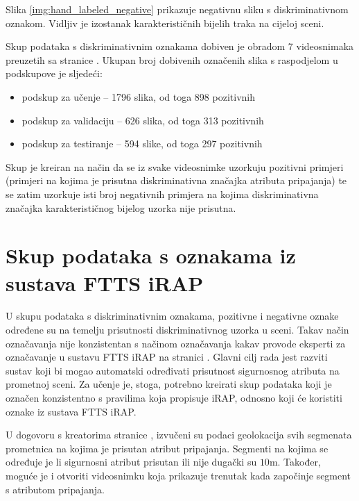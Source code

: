 \documentclass[times, utf8, diplomski, numeric]{fer}
\begin{document}
\noindent Slika \ref{img:hand_labeled_negative} prikazuje negativnu sliku s diskriminativnom oznakom.
Vidljiv je izostanak karakterističnih bijelih traka na cijeloj sceni.

Skup podataka s diskriminativnim oznakama dobiven je obradom 7 videosnimaka preuzetih sa stranice \citep{url:ftts_irap}. 
Ukupan broj dobivenih označenih slika s raspodjelom u podskupove je sljedeći:
\begin{itemize}
 \item podskup za učenje -- 1796 slika, od toga 898 pozitivnih
 \item podskup za validaciju -- 626 slika, od toga 313 pozitivnih
 \item podskup za testiranje -- 594 slike, od toga 297 pozitivnih
\end{itemize}

\noindent Skup je kreiran na način da se iz svake videosnimke uzorkuju pozitivni primjeri (primjeri na kojima je prisutna diskriminativna značajka atributa pripajanja) te se zatim uzorkuje isti broj negativnih primjera na kojima diskriminativna značajka karakterističnog bijelog uzorka nije prisutna.

\section{Skup podataka s oznakama iz sustava FTTS iRAP}
U skupu podataka s diskriminativnim oznakama, pozitivne i negativne oznake određene su na temelju prisutnosti diskriminativnog uzorka u sceni. 
Takav način označavanja nije konzistentan s načinom označavanja kakav provode eksperti za označavanje u sustavu FTTS iRAP na stranici \citep{url:ftts_irap}.
Glavni cilj rada jest razviti sustav koji bi mogao automatski određivati prisutnost sigurnosnog atributa na prometnoj sceni. 
Za učenje je, stoga, potrebno kreirati skup podataka koji je označen konzistentno s pravilima koja propisuje iRAP, odnosno koji će koristiti oznake iz sustava FTTS iRAP.

U dogovoru s kreatorima stranice \citep{url:ftts_irap}, izvučeni su podaci geolokacija svih segmenata prometnica na kojima je prisutan atribut pripajanja. 
Segmenti na kojima se određuje je li sigurnosni atribut prisutan ili nije dugački su $10$m.
Također, moguće je i otvoriti videosnimku koja prikazuje trenutak kada započinje segment s atributom pripajanja.
\end{document}
